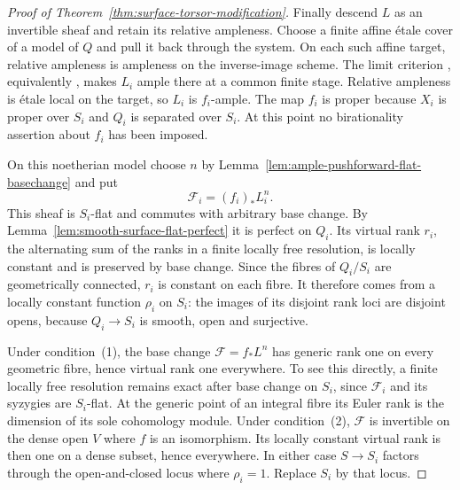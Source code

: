 \begin{proof}[Proof of Theorem~\ref{thm:surface-torsor-modification}]
Finally descend $L$ as an invertible sheaf and retain its relative
ampleness. Choose a finite affine \textup{\'etale} cover of a model
of $Q$ and pull it back through the system. On each such affine
target, relative ampleness is ampleness on the inverse-image scheme.
The limit criterion \cite[IV$_3$, 8.10.5.2]{EGA}, equivalently
\cite[Tag~09MT]{Stacks}, makes $L_i$ ample there at a common finite
stage. Relative ampleness is \textup{\'etale} local on the target,
so $L_i$ is $f_i$-ample. The map $f_i$ is proper because $X_i$ is
proper over $S_i$ and $Q_i$ is separated over $S_i$. At this point
no birationality assertion about $f_i$ has been imposed.

On this noetherian model choose $n$ by
Lemma~\ref{lem:ample-pushforward-flat-basechange} and put
\[
 \mathcal F_i=(f_i)_*L_i^n.
\]
This sheaf is $S_i$-flat and commutes with arbitrary base change.
By Lemma~\ref{lem:smooth-surface-flat-perfect} it is perfect on
$Q_i$. Its virtual rank $r_i$, the alternating sum of the ranks in
a finite locally free resolution, is locally constant and is preserved
by base change. Since the fibres of $Q_i/S_i$ are geometrically
connected, $r_i$ is constant on each fibre. It therefore comes from
a locally constant function $\rho_i$ on $S_i$: the images of its
disjoint rank loci are disjoint opens, because $Q_i\to S_i$ is
smooth, open and surjective.

Under condition~(1), the base change $\mathcal F=f_*L^n$ has generic
rank one on every geometric fibre, hence virtual rank one everywhere.
To see this directly, a finite locally free resolution remains exact
after base change on $S_i$, since $\mathcal F_i$ and its syzygies
are $S_i$-flat. At the generic point of an integral fibre its Euler
rank is the dimension of its sole cohomology module. Under
condition~(2), $\mathcal F$ is invertible on the dense open $V$ where
$f$ is an isomorphism. Its locally constant virtual rank is then one
on a dense subset, hence everywhere. In either case $S\to S_i$
factors through the open-and-closed locus where $\rho_i=1$.
Replace $S_i$ by that locus.


\end{proof}
